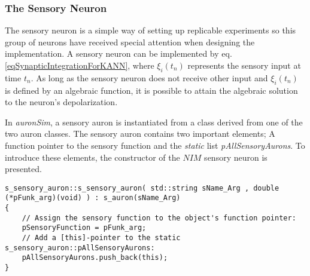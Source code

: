 		\subsubsection{The Sensory Neuron} 		%
		\label{sssectionSensoryNeuron}
			The sensory neuron is a simple way of setting up replicable experiments so this group of neurons have received special attention when designing the implementation.
			A sensory neuron can be implemented by eq. \eqref{eqSynapticIntegrationForKANN}, where $\xi_i(t_n)$ represents the sensory input at time $t_n$.
			As long as the sensory neuron does not receive other input and $\xi_i(t_n)$ is defined by an algebraic function, it is possible to attain the algebraic solution to the neuron's depolarization.

			In \emph{auronSim}, a sensory auron is instantiated from a class derived from one of the two auron classes. %
			The sensory auron contains two important elements;
				A function pointer to the sensory function and the \emph{static} list \emph{pAllSensoryAurons}.
			To introduce these elements, the constructor of the $NIM$ sensory neuron is presented.
\begin{lstlisting}
s_sensory_auron::s_sensory_auron( std::string sName_Arg , double (*pFunk_arg)(void) ) : s_auron(sName_Arg)
{
    // Assign the sensory function to the object's function pointer: 
    pSensoryFunction = pFunk_arg;
    // Add a [this]-pointer to the static s_sensory_auron::pAllSensoryAurons:
    pAllSensoryAurons.push_back(this);
}
\end{lstlisting}

